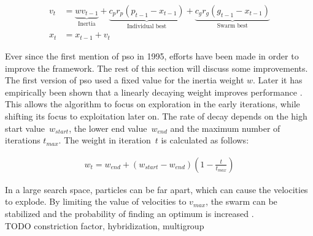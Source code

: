 
\begin{align} 
v_{t} &= \underbrace{wv_{t-1}}_\text{Inertia} + \underbrace{c_pr_p(p_{t-1} - x_{t-1})}_\text{Individual best} + \underbrace{c_gr_g(g_{t-1} - x_{t-1})}_\text{Swarm best} \label{eq:velocity_update}\\
x_{t} &= x_{t-1} + v_{t} \label{eq:position_update}
\end{align}

Ever since the first mention of \gls{pso} in 1995, efforts have been made in order to improve the framework. The rest of this section will discuss some improvements.\\

The first version of \gls{pso} used a fixed value for the inertia weight $w$. Later it has empirically been shown that a linearly decaying weight improves performance \cite{pso_study}. This allows the algorithm to focus on exploration in the early iterations, while shifting its focus to exploitation later on. The rate of decay depends on the high start value~$w_{start}$, the lower end value~$w_{end}$ and the maximum number of iterations $t_{max}$. The weight in iteration~$t$ is calculated as follows:

\begin{align}
w_t = w_{end} + (w_{start} - w_{end})\left(1 - \frac{t}{t_{max}}\right) \label{eq:weight}
\end{align}

In a large search space, particles can be far apart, which can cause the velocities to explode. By limiting the value of velocities to $v_{max}$, the swarm can be stabilized and the probability of finding an optimum is increased \cite{pso}.\\

TODO constriction factor, hybridization, multigroup

